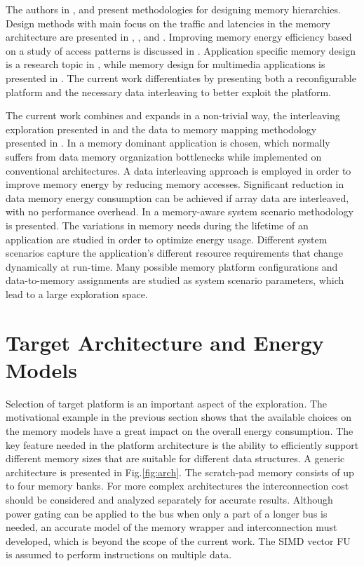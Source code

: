 The authors in \cite{abraham1999automatic}, \cite{jacob1996analytical} and \cite{li1999hardware} present methodologies for designing memory hierarchies.
Design methods with main focus on the traffic and latencies in the memory architecture are presented in \cite{chen1999loop}, \cite{grun2000mist}, \cite{jantsch1994hardware} and \cite{passes1995multi}.
Improving memory energy efficiency based on a study of access patterns is discussed in \cite{kandemir2001improving}.
Application specific memory design is a research topic in \cite{schmit1997synthesis}, while memory design for multimedia applications is presented in \cite{oshima1997high}.
The current work differentiates by presenting both a reconfigurable platform and the necessary data interleaving to better exploit the platform.

The current work combines and expands in a non-trivial way, the interleaving exploration presented in \cite{sharma2013data} and the data to memory mapping methodology presented in \cite{filippopoulos2013exploration}. 
In \cite{sharma2013data} a memory dominant application is chosen, which normally suffers from data memory organization bottlenecks while implemented on conventional architectures. 
A data interleaving approach is employed in order to improve memory energy by reducing memory accesses.
Significant reduction in data memory energy consumption can be achieved if array data are interleaved, with no performance overhead.
In \cite{filippopoulos2013exploration} a memory-aware system scenario methodology is presented.
The variations in memory needs during the lifetime of an application are studied in order to optimize energy usage.
Different system scenarios capture the application's different resource requirements that change dynamically at run-time.
Many possible memory platform configurations and data-to-memory assignments are studied as system scenario parameters, which lead to a large exploration space.

\section{Target Architecture and Energy Models}
\label{sec:platformD}

Selection of target platform is an important aspect of the exploration.
The motivational example in the previous section shows that the available choices on the memory models have a great impact on the overall energy consumption.
 The key feature needed in the platform architecture is the ability to efficiently support different memory sizes that are suitable for different data structures.
A generic architecture is presented in Fig.\ref{fig:arch}.
The scratch-pad memory consists of up to four memory banks. 
For more complex architectures the interconnection cost should be considered and analyzed separately for accurate results. 
Although power gating can be applied to the bus when only a part of a longer bus is needed, an accurate model of the memory wrapper and interconnection must developed, which is beyond the scope of the current work.
The SIMD vector FU is assumed to perform instructions on multiple data.

